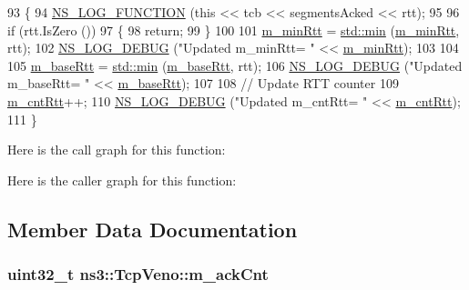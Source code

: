 \begin{DoxyCode}
93 \{
94   \hyperlink{log-macros-disabled_8h_a90b90d5bad1f39cb1b64923ea94c0761}{NS\_LOG\_FUNCTION} (\textcolor{keyword}{this} << tcb << segmentsAcked << rtt);
95 
96   \textcolor{keywordflow}{if} (rtt.IsZero ())
97     \{
98       \textcolor{keywordflow}{return};
99     \}
100 
101   \hyperlink{classns3_1_1TcpVeno_a9fd4b7308b7f0b7cd4179d6f65aba383}{m\_minRtt} = \hyperlink{80211b_8c_ac6afabdc09a49a433ee19d8a9486056d}{std::min} (\hyperlink{classns3_1_1TcpVeno_a9fd4b7308b7f0b7cd4179d6f65aba383}{m\_minRtt}, rtt);
102   \hyperlink{group__logging_ga413f1886406d49f59a6a0a89b77b4d0a}{NS\_LOG\_DEBUG} (\textcolor{stringliteral}{"Updated m\_minRtt= "} << \hyperlink{classns3_1_1TcpVeno_a9fd4b7308b7f0b7cd4179d6f65aba383}{m\_minRtt});
103 
104 
105   \hyperlink{classns3_1_1TcpVeno_aeae3dd21752b2d7dd774202fe8a6d5e1}{m\_baseRtt} = \hyperlink{80211b_8c_ac6afabdc09a49a433ee19d8a9486056d}{std::min} (\hyperlink{classns3_1_1TcpVeno_aeae3dd21752b2d7dd774202fe8a6d5e1}{m\_baseRtt}, rtt);
106   \hyperlink{group__logging_ga413f1886406d49f59a6a0a89b77b4d0a}{NS\_LOG\_DEBUG} (\textcolor{stringliteral}{"Updated m\_baseRtt= "} << \hyperlink{classns3_1_1TcpVeno_aeae3dd21752b2d7dd774202fe8a6d5e1}{m\_baseRtt});
107 
108   \textcolor{comment}{// Update RTT counter}
109   \hyperlink{classns3_1_1TcpVeno_a56ba63c2e02200d19b808741c1f68c64}{m\_cntRtt}++;
110   \hyperlink{group__logging_ga413f1886406d49f59a6a0a89b77b4d0a}{NS\_LOG\_DEBUG} (\textcolor{stringliteral}{"Updated m\_cntRtt= "} << \hyperlink{classns3_1_1TcpVeno_a56ba63c2e02200d19b808741c1f68c64}{m\_cntRtt});
111 \}
\end{DoxyCode}


Here is the call graph for this function\+:




Here is the caller graph for this function\+:




\subsection{Member Data Documentation}
\subsubsection[{\texorpdfstring{m\+\_\+ack\+Cnt}{m_ackCnt}}]{\setlength{\rightskip}{0pt plus 5cm}uint32\+\_\+t ns3\+::\+Tcp\+Veno\+::m\+\_\+ack\+Cnt\hspace{0.3cm}{\ttfamily [private]}}\hypertarget{classns3_1_1TcpVeno_abcf5701edb3712b02e492701f1abfdac}{}\label{classns3_1_1TcpVeno_abcf5701edb3712b02e492701f1abfdac}


